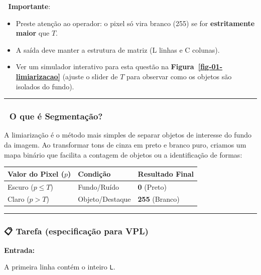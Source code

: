 \documentclass[
  portuguese,
  letterpaper,
  openany,
  oneside,
  12pt,
  a4paper]{book}
\providecommand{\tightlist}{%
  \setlength{\itemsep}{0pt}\setlength{\parskip}{0pt}}
\begin{document}
📌 \textbf{Importante}:

\begin{itemize}
\tightlist
\item
  Preste atenção ao operador: o pixel só vira branco (255) se for
  \textbf{estritamente maior} que \(T\).
\item
  A saída deve manter a estrutura de matriz (L linhas e C colunas).
\item
  Ver um simulador interativo para esta questão na
  \textbf{Figura~\ref{fig-01-limiarizacao}} (ajuste o slider de \(T\)
  para observar como os objetos são isolados do fundo).
\end{itemize}

\begin{center}\rule{0.5\linewidth}{0.5pt}\end{center}

\subsubsection{🧠 O que é
Segmentação?}\label{o-que-uxe9-segmentauxe7uxe3o}

A limiarização é o método mais simples de separar objetos de interesse
do fundo da imagem. Ao transformar tons de cinza em preto e branco puro,
criamos um mapa binário que facilita a contagem de objetos ou a
identificação de formas:

\begin{longtable}[]{@{}lll@{}}
\toprule\noalign{}
Valor do Pixel (\(p\)) & Condição & Resultado Final \\
\midrule\noalign{}
\endhead
\bottomrule\noalign{}
\endlastfoot
Escuro (\(p \le T\)) & Fundo/Ruído & \textbf{0} (Preto) \\
Claro (\(p > T\)) & Objeto/Destaque & \textbf{255} (Branco) \\
\end{longtable}

\begin{center}\rule{0.5\linewidth}{0.5pt}\end{center}

\subsubsection{📋 Tarefa (especificação para
VPL)}\label{tarefa-especificauxe7uxe3o-para-vpl-4}

\textbf{Entrada:}

A primeira linha contém o inteiro \texttt{L}.
\end{document}
